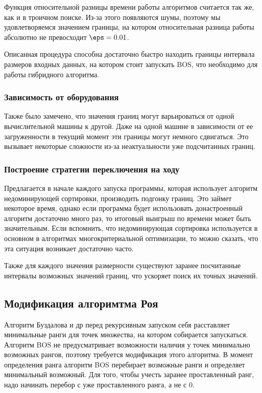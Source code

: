 Функция относительной разницы времени работы алгоритмов считается так же, как и в троичном поиске. Из-за этого
появляются шумы, поэтому мы удовлетворяемся значением границы, на котором относительная разница работы абсолютно
не превосходит $\eps = 0.01$.

Описанная процедура способна достаточно быстро находить границы интервала размеров входных данных, на котором стоит
запускать BOS, что необходимо для работы гибридного алгоритма.


\subsubsection{Зависимость от оборудования}

Также было замечено, что значения границ могут варьироваться от одной вычислительной машины к другой. Даже на одной
машине в зависимости от ее загруженности в текущий момент эти границы могут немного сдвигаться. Это вызывает
некоторые сложности из-за неактуальности уже подсчитанных границ.

\subsubsection{Построение стратегии переключения на ходу}

Предлагается в начале каждого запуска программы, которая использует алгоритм недоминирующей сортировки, производить
подгонку границ. Это займет некоторое время, однако если программа будет использовать донастроенный алгоритм
достаточно много раз, то итоговый выигрыш по времени может быть значительным. Если вспомнить, что недоминирующая
сортировка используется в основном в алгоритмах многокритериальной оптимизации, то можно сказать, что эта ситуация
возникает достаточно часто.

Также для каждого значения размерности существуют заранее посчитанные интервалы возможных значений границ, что
ускоряет поиск их точных значений.

\subsection{Модификация алгоримтма Роя}
Алгоритм Буздалова и др перед рекурсивным запуском себя расставляет минимальные ранги для
точек множества, на котором собирается запускаться. Алгоритм BOS не предусматривает возможности наличия у точек
минимально возможных рангов, поэтому требуется модификация этого алгоритма.
В момент определения ранга алгоритм BOS перебирает возможные ранги и определяет минимальный возможный. Для того, чтобы
учесть заранее проставленный ранг, надо начинать перебор с уже проставленного ранга, а не с 0.



